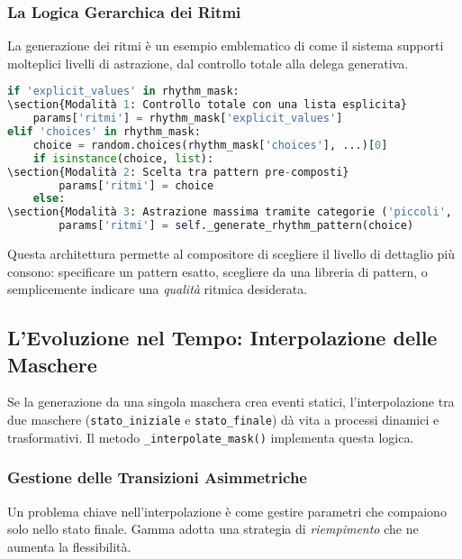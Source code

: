 \subsubsection{La Logica Gerarchica dei Ritmi}
La generazione dei ritmi è un esempio emblematico di come il sistema supporti molteplici livelli di astrazione, dal controllo totale alla delega generativa.

\begin{lstlisting}[language=Python]
if 'explicit_values' in rhythm_mask:
\section{Modalità 1: Controllo totale con una lista esplicita}
    params['ritmi'] = rhythm_mask['explicit_values']
elif 'choices' in rhythm_mask:
    choice = random.choices(rhythm_mask['choices'], ...)[0]
    if isinstance(choice, list):
\section{Modalità 2: Scelta tra pattern pre-composti}
        params['ritmi'] = choice
    else:
\section{Modalità 3: Astrazione massima tramite categorie ('piccoli', 'medi'...)}
        params['ritmi'] = self._generate_rhythm_pattern(choice)
\end{lstlisting}
Questa architettura permette al compositore di scegliere il livello di dettaglio più consono: specificare un pattern esatto, scegliere da una libreria di pattern, o semplicemente indicare una \textit{qualità} ritmica desiderata.
\subsection{L'Evoluzione nel Tempo: Interpolazione delle Maschere}
Se la generazione da una singola maschera crea eventi statici, l'interpolazione tra due maschere (\texttt{stato\_iniziale} e \texttt{stato\_finale}) dà vita a processi dinamici e trasformativi. Il metodo \texttt{\_interpolate\_mask()} implementa questa logica.
\subsubsection{Gestione delle Transizioni Asimmetriche}
Un problema chiave nell'interpolazione è come gestire parametri che compaiono solo nello stato finale. Gamma adotta una strategia di \textit{riempimento} che ne aumenta la flessibilità.

